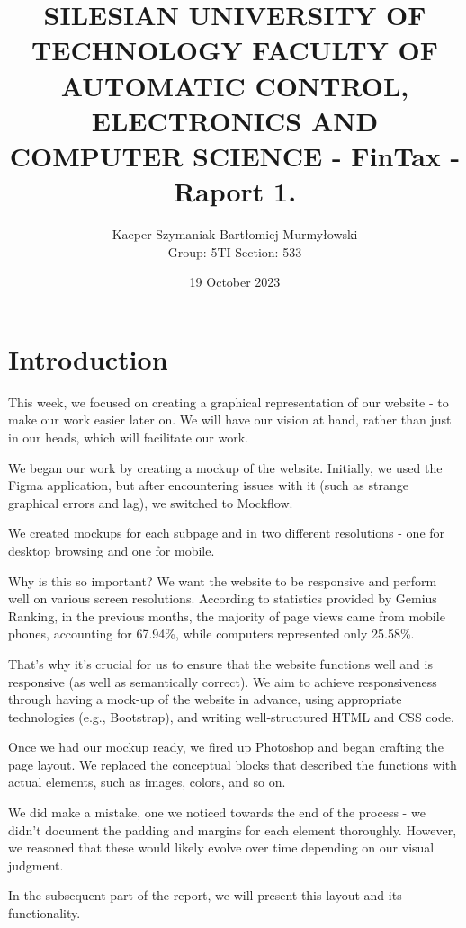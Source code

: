 \documentclass{article}
\title{\textbf{SILESIAN UNIVERSITY OF TECHNOLOGY FACULTY OF AUTOMATIC CONTROL, ELECTRONICS AND COMPUTER SCIENCE - FinTax - Raport 1.
}}
\author{Kacper Szymaniak Bartłomiej Murmyłowski \\
Group: 5TI Section: 533
}
\date{19 October 2023}
\begin{document}
\thispagestyle{empty}
    \maketitle
 \restoregeometry
    \newpage
{}   
\fontsize{14}{16}\selectfont

\tableofcontents

    
    \newpage
    \section{Introduction}
This week, we focused on creating a graphical representation of our website - to make our work easier later on. We will have our vision at hand, rather than just in our heads, which will facilitate our work.

We began our work by creating a mockup of the website. Initially, we used the Figma application, but after encountering issues with it (such as strange graphical errors and lag), we switched to Mockflow.

We created mockups for each subpage and in two different resolutions - one for desktop browsing and one for mobile.

Why is this so important? We want the website to be responsive and perform well on various screen resolutions. According to statistics provided by Gemius Ranking, in the previous months, the majority of page views came from mobile phones, accounting for 67.94\%, while computers represented only 25.58\%.

That's why it's crucial for us to ensure that the website functions well and is responsive (as well as semantically correct). We aim to achieve responsiveness through having a mock-up of the website in advance, using appropriate technologies (e.g., Bootstrap), and writing well-structured HTML and CSS code.

Once we had our mockup ready, we fired up Photoshop and began crafting the page layout. We replaced the conceptual blocks that described the functions with actual elements, such as images, colors, and so on.

We did make a mistake, one we noticed towards the end of the process - we didn't document the padding and margins for each element thoroughly. However, we reasoned that these would likely evolve over time depending on our visual judgment.

In the subsequent part of the report, we will present this layout and its functionality.
    
\end{document}
